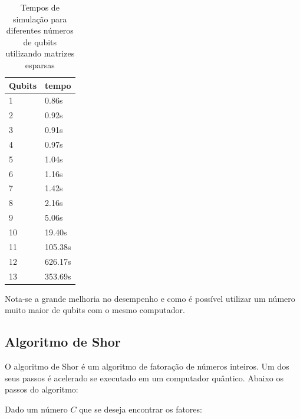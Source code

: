 \documentclass[12pt,a4paper]{article}
\begin{document}
\begin{table}[htb]
\centering
\begin{adjustbox}{center}
\begin{tabular}{|l|l|}  
\hline
Qubits  & tempo \\ \hline
1  & 0.86s \\ \hline
2  &  0.92s\\ \hline
3  &   0.91s\\ \hline
4  &  0.97s\\ \hline
5  &  1.04s\\ \hline
6  &   1.16s\\ \hline

7  &   1.42s\\ \hline

8  &   2.16s\\ \hline

9  &   5.06s\\ \hline

10  &   19.40s\\ \hline

11 &   105.38s\\ \hline

12 &   626.17s\\ \hline

13 &   353.69s\\ \hline

\end{tabular}
\end{adjustbox}
\caption{Tempos de simulação para diferentes números de qubits utilizando matrizes esparsas}
\end{table}

Nota-se a grande melhoria no desempenho e como é possível utilizar um número muito maior de qubits com o mesmo computador.

\subsection{Algoritmo de Shor}
 O algoritmo de Shor é um algoritmo de fatoração de números inteiros. Um dos seus passos é acelerado se executado em um computador quântico. Abaixo os passos do algoritmo:

Dado um número $C$ que se deseja encontrar os fatores:
\end{document}
